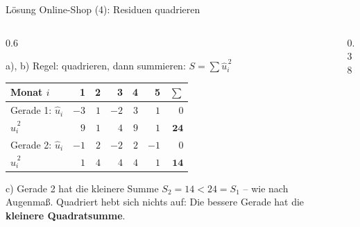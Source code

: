 \documentclass[aspectratio=169,11pt]{beamer}
\def\uebliste{1/21,2/26,3/24,4/30,5/29}
\newcommand{\quadratevon}[4]{%
  \foreach \px/\py in #1 {%
    \pgfmathsetmacro{\yh}{#2 + #3*\px}%
    \pgfmathsetmacro{\ur}{abs(\py - \yh)}%
    \pgfmathsetmacro{\pxr}{\px + \ur}%
    \edef\tmpdraw{\noexpand\draw[#4] (axis cs:\px,\yh) rectangle (axis cs:\pxr,\py);}%
    \tmpdraw
  }}
\begin{document}
\begin{frame}{Lösung Online-Shop (4): Residuen quadrieren}
  \begin{columns}[T]
    \begin{column}{0.6\textwidth}
      \begin{block}{a), b) Regel: quadrieren, dann summieren: $S = \sum \hat{u}_i^{\,2}$}
        \begin{center}
          \small
          \renewcommand{\arraystretch}{1.05}
          \begin{tabular}{lrrrrrr}
            \toprule
            Monat $i$                                & 1    & 2   & 3    & 4   & 5    & $\sum$ \\
            \midrule
            {\color{hsbiaccent}Gerade 1}: $\hat{u}_i$ & $-3$ & $1$ & $-2$ & $3$ & $1$  & $0$ \\
            \phantom{Gerade 1: }$\hat{u}_i^{\,2}$     & $9$  & $1$ & $4$  & $9$ & $1$  & $\mathbf{24}$ \\
            \midrule
            {\color{hsbiviolet}Gerade 2}: $\hat{u}_i$ & $-1$ & $2$ & $-2$ & $2$ & $-1$ & $0$ \\
            \phantom{Gerade 2: }$\hat{u}_i^{\,2}$     & $1$  & $4$ & $4$  & $4$ & $1$  & $\mathbf{14}$ \\
            \bottomrule
          \end{tabular}
        \end{center}
      \end{block}
      \begin{alertblock}{c) Gerade 2 hat die kleinere Summe}
        $S_2 = 14 < 24 = S_1$ -- wie nach Augenmaß. Quadriert hebt sich nichts auf:
        Die bessere Gerade hat die \textbf{kleinere Quadratsumme}.
      \end{alertblock}
    \end{column}
    \begin{column}{0.38\textwidth}
      \begin{center}
\end{center}
\end{column}
\end{columns}
\end{frame}
\end{document}
